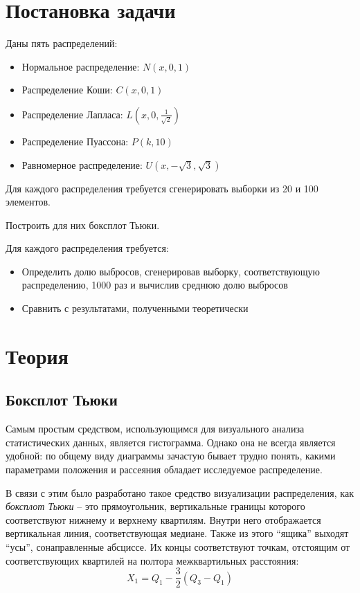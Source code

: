 \section{Постановка задачи}
Даны пять распределений:
\begin{itemize}
\item Нормальное распределение: $N(x, 0, 1)$
\item Распределение Коши: $C(x, 0, 1)$
\item Распределение Лапласа: $L(x, 0, \frac{1}{\sqrt{2}})$
\item Распределение Пуассона: $P(k, 10)$
\item Равномерное распределение: $U(x, -\sqrt{3}, \sqrt{3})$
\end{itemize}

Для каждого распределения требуется сгенерировать выборки из 20 и 100 элементов.

Построить для них боксплот Тьюки.

Для каждого распределения требуется:
\begin{itemize}
	\item Определить долю выбросов, сгенерировав выборку, соответствующую распределению, 1000 раз и вычислив среднюю долю выбросов
	\item Сравнить с результатами, полученными теоретически
\end{itemize}

\section{Теория}

\subsection{Боксплот Тьюки}
Самым простым средством, использующимся для визуального анализа статистических данных, является гистограмма. Однако она не всегда является удобной: по общему виду диаграммы зачастую бывает трудно понять, какими параметрами положения и рассеяния обладает исследуемое распределение.

В связи с этим было разработано такое средство визуализации распределения, как \textit{боксплот Тьюки} -- это прямоугольник, вертикальные границы которого соответствуют нижнему и верхнему квартилям. Внутри него отображается вертикальная линия, соответствующая медиане. Также из этого ``ящика'' выходят ``усы'', сонаправленные абсциссе. Их концы соответствуют точкам, отстоящим от соответствующих квартилей на полтора межквартильных расстояния:
\begin{equation}
	X_1 = Q_1 - \frac{3}{2}(Q_3-Q_1)
\end{equation}


